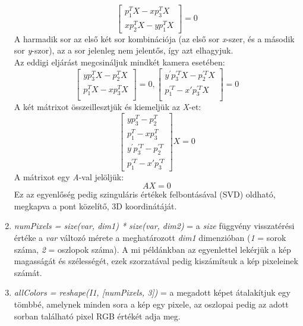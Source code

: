 \documentclass[12pt]{report}
\begin{document}
\begin{enumerate}
\[\begin{bmatrix}
                        p_1^TX - xp_3^TX \\
                        xp_2^TX - yp_1^TX
                        \end{bmatrix} = 0\]
                        A harmadik sor az első két sor kombinációja (az első sor \textit{x}-szer, és a második sor \textit{y}-szor), az a sor jelenleg nem jelentős, így azt elhagyjuk.\\
                        Az eddigi eljárást megcsináljuk mindkét kamera esetében:
                        \[\begin{bmatrix}
                        yp_3^{T}X - p_2^{T}X \\
                        p_1^{T}X - xp_3^{T}X \\
                        \end{bmatrix} = 0, 
                        \begin{bmatrix}
                        y^{'}p_3^{'T}X - p_2^{'T}X \\
                        p_1^{'T} - x'p_3^{'T}X \\
                        \end{bmatrix} = 0\]
                        A két mátrixot összeillesztjük és kiemeljük az \textit{X}-et:
                        \[\begin{bmatrix}
                        yp_3^{T} - p_2^{T} \\
                        p_1^{T} - xp_3^{T} \\
                        y^{'}p_3^{'T} - p_2^{'T} \\
                        p_1^{'T} - x'p_3^{'T}
                        \end{bmatrix}X = 0\]
                        A mátrixot egy \textit{A}-val jelöljük:
                        \[AX = 0\]
                        Ez az egyenlőség pedig szinguláris értékek felbontásával (SVD) oldható, megkapva a pont közelítő, 3D koordinátáját.
                        \item \textit{numPixels = size(var, dim1) * size(var, dim2)} = a \textit{size} függvény visszatérési értéke a \textit{var} változó mérete a meghatározott \textit{dim1} dimenzióban (\textit{1} = sorok száma, \textit{2} = oszlopok száma). A mi példánkban az egyenlettel lekérjük a kép magasságát és szélességét, ezek szorzatával pedig kiszámítsuk a kép pixeleinek számát.
                        \item \textit{allColors = reshape(I1, [numPixels, 3])} = a megadott képet átalakítjuk egy tömbbé, amelynek minden sora a kép egy pixele, az oszlopai pedig az adott sorban található pixel RGB értékét adja meg.

\end{enumerate}
\end{document}

